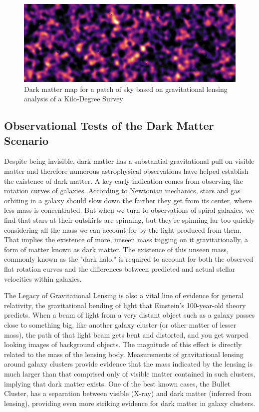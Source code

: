  
\begin{figure}[H]
    \centering
    \includegraphics[width=1\linewidth]{Chap1/dark_matter_map.jpg}
    \caption{Dark matter map for a patch of sky based on gravitational lensing analysis of a Kilo-Degree Survey \cite{wikiDM}} 
    \label{fig:enter-label}
\end{figure}





\subsection{Observational Tests of the Dark Matter Scenario }  
Despite being invisible, dark matter has a substantial gravitational pull on visible matter and therefore numerous astrophysical observations have helped establish the existence of dark matter. A key early indication comes from observing the rotation curves of galaxies. According to Newtonian mechanics, stars and gas orbiting in a galaxy should slow down the farther they get from its center, where less mass is concentrated. But when we turn to observations of spiral galaxies, we find that stars at their outskirts are spinning, but they’re spinning far too quickly considering all the mass we can account for by the light produced from them. That implies the existence of more, unseen mass tugging on it gravitationally, a form of matter known as dark matter. The existence of this unseen mass, commonly known as the "dark halo," is required to account for both the observed flat rotation curves and the differences between predicted and actual stellar velocities within galaxies.

The Legacy of Gravitational Lensing is also a vital line of evidence for general relativity, the gravitational bending of light that Einstein’s 100-year-old theory predicts. When a beam of light from a very distant object such as a galaxy passes close to something big, like another galaxy cluster (or other matter of lesser mass), the path of that light beam gets bent and distorted, and you get warped looking images of background objects. The magnitude of this effect is directly related to the mass of the lensing body. Measurements of gravitational lensing around galaxy clusters provide evidence that the mass indicated by the lensing is much larger than that comprised only of visible matter contained in such clusters, implying that dark matter exists. One of the best known cases, the Bullet Cluster, has a separation between visible (X-ray) and dark matter (inferred from lensing), providing even more striking evidence for dark matter in galaxy clusters.\cite{clowe2006}

